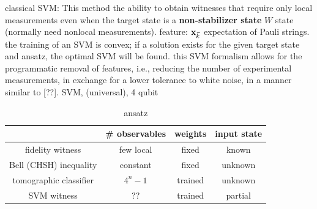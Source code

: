 \documentclass[
reprint,
aps,
pra,
floatfix,
]{revtex4-2}
\theoremstyle{plain}
\theoremstyle{definition}
\begin{document}
classical SVM: 
\cite{zhuMachineLearningDerivedEntanglement2021}
This method the ability to obtain witnesses that require only local measurements even when the target state is a \textbf{non-stabilizer state} $W$ state (normally need nonlocal measurements).
feature: $\vb{x}_{\vec{k}}$ expectation of Pauli strings.
the training of an SVM is convex; if a solution exists for the given target state and ansatz, the optimal SVM will be found.
this SVM formalism allows for the programmatic removal of features, i.e., reducing the number of experimental measurements, in exchange for a lower tolerance to white noise, in a manner similar to [??].
SVM, (universal), 4 qubit \cite{vintskevichClassificationFourqubitEntangled2022}



\begin{table}[!ht]
	\centering
	\begin{tabular}{c|c|c|c}
		& \# observables & weights & input state \\
		\hline
		fidelity  witness & few local & fixed & known  \\  
		Bell (CHSH) inequality & constant & fixed & unknown \\  
		tomographic classifier \cite{maTransformingBellInequalities2018} & $4^n-1$ & trained & unknown \\  
		SVM witness & ?? & trained & partial \\  
		\hline
	\end{tabular}
	\caption{ansatz}
\end{table}
\end{document}
